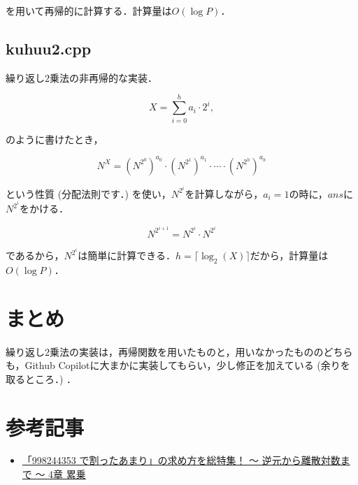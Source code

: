 \documentclass[slide,20pt]{ltjsarticle}
\begin{document}
を用いて再帰的に計算する．計算量は$O(\log P)$．



\newpage

\subsection*{kuhuu2.cpp}
繰り返し$2$乗法の非再帰的な実装．

\[ X = \sum_{i = 0} ^ {h} a_i \cdot 2 ^ i, \]

のように書けたとき，

\[ N ^ X = \left(N ^ {2 ^ 0}\right) ^ {a_0} \cdot \left(N ^ {2 ^ 1}\right) ^ {a_1} \cdot \cdots \cdot \left(N ^ {2 ^ h}\right) ^ {a_h} \]

という性質 (分配法則です．) を使い，$N ^ {2 ^ i}$を計算しながら，$a_i = 1$の時に，$ans$に$N ^ {2 ^ i}$をかける．

\[ N ^ {2 ^ {i + 1}} = N ^ {2 ^ {i}} \cdot N ^ {2 ^ {i}} \]

であるから，$N ^ {2 ^ i}$は簡単に計算できる．$h = \lceil \log_2(X) \rceil$だから，計算量は$O(\log P)$．



\section*{まとめ}
繰り返し$2$乗法の実装は，再帰関数を用いたものと，用いなかったもののどちらも，Github Copilotに大まかに実装してもらい，少し修正を加えている (余りを取るところ．) ．

\begingroup
\let\clearpage\relax
\section*{参考記事}
\endgroup
\begin{itemize}
\item \href{https://qiita.com/drken/items/3b4fdf0a78e7a138cd9a#4-%E7%B4%AF%E4%B9%97-an}{「998244353 で割ったあまり」の求め方を総特集！ 〜 逆元から離散対数まで 〜 4章 累乗}
\end{itemize}
\end{document}

